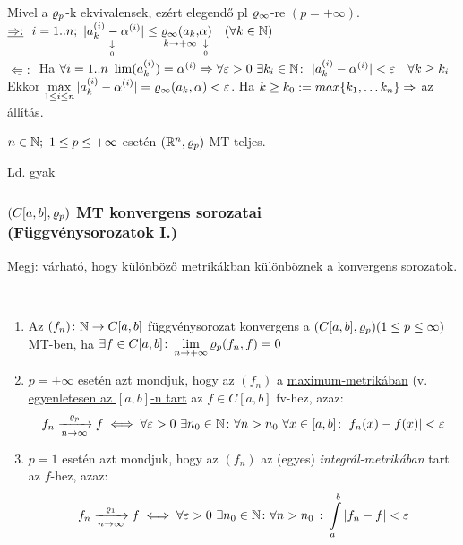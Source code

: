 \begin{biz}
  Mivel a $\varrho_p$-k ekvivalensek, ezért elegendő pl
  $\varrho_{\infty}$-re $(p=+\infty)$.\\
  $\underline{\Rightarrow:}\ \ i=1..n;\
  \underset{\underset{0}{\downarrow}}{|a_k^{(i)} - \alpha^{(i)}}|
  \leq \underset{k\to+\infty}{\varrho_\infty
    (a_k,}\underset{\underset0\downarrow}{\alpha)} \quad(\forall k\in\mathbb{N})$\\
  $\underline{\Leftarrow:}\ $ Ha $\forall i=1..n\
  \lim(a_k^{(i)})=\alpha^{(i)} \Rightarrow \forall \varepsilon >0\ \exists k_i\in
  \mathbb{N}\colon \ |a_k^{(i)}-\alpha^{(i)}|<\varepsilon \quad \forall k\geq k_i$\\
  Ekkor $\displaystyle\max_{1\leq i \leq n} |a_k^{(i)} - \alpha^{(i)}| =
  \varrho_\infty(a_k,\alpha) < \varepsilon $. Ha $k\geq k_0:= max\{k_1,\ldots
  k_n\} \Rightarrow$ az állítás.
\end{biz}

\begin{te}
  $n\in\mathbb{N};\ 1\leq p\leq +\infty$ esetén $(\mathbb{R}^n,\varrho_p)$ MT teljes.
\end{te}
\begin{biz}
  Ld. gyak
\end{biz}

\subsubsection[Konvergens függvénysorozatok]{$(C[a,b],\varrho_p)$ MT
  konvergens  sorozatai\\ (Függvénysorozatok I.)}
Megj: várható, hogy különböző metrikákban különböznek a konvergens
sorozatok.
\begin{de}\ 
  \begin{enumerate}[\quad(a)]
  \item Az $(f_n)\colon \mathbb{N}\to C[a,b]$ függvénysorozat konvergens a
    $(C[a,b],\varrho_p)\\(1\leq p\leq\infty)$ MT-ben, ha  $\exists f\in
    \displaystyle C[a,b]\colon \lim_{n\to+\infty}\varrho_p(f_n,f)=0$
  \item $p=+\infty$ esetén azt mondjuk, hogy az $(f_n)$ a
    \underline{maximum-metrikában} (v. \underline{egyenletesen az }
    \underline{$[a,b]$-n tart} az $f\in C[a,b]$ fv-hez, azaz:\\
    \[f_n \xrightarrow[n\to\infty]{\varrho_p} f \iff \forall\varepsilon>0\
    \exists n_0\in\mathbb{N}\colon \forall n>n_0\  \forall  x\in[a,b]\colon
    |f_n(x)-f(x)| < \varepsilon\]
  \item $p=1$ esetén azt mondjuk, hogy az $(f_n)$ az (egyes)
    \emph{integrál-metrikában} tart az $f$-hez, azaz:
    \[f_n \xrightarrow[n\to\infty]{\varrho_1} f \iff \forall\varepsilon>0\
    \exists n_0\in\mathbb{N}\colon \forall n>n_0\ \colon \displaystyle\int\limits_a^b
    |f_n-f| < \varepsilon\]

  \end{enumerate} 
\end{de}

